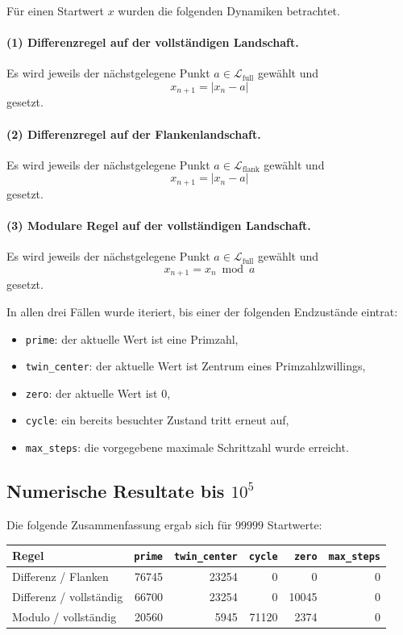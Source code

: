 \documentclass[11pt,a4paper]{article}
\theoremstyle{definition}
\theoremstyle{plain}
\theoremstyle{remark}
\begin{document}
	Für einen Startwert \(x\) wurden die folgenden Dynamiken betrachtet.
	
	\paragraph{(1) Differenzregel auf der vollständigen Landschaft.}
	Es wird jeweils der nächstgelegene Punkt \(a\in\mathcal L_{\mathrm{full}}\) gewählt und
	\[
	x_{n+1}=|x_n-a|
	\]
	gesetzt.
	
	\paragraph{(2) Differenzregel auf der Flankenlandschaft.}
	Es wird jeweils der nächstgelegene Punkt \(a\in\mathcal L_{\mathrm{flank}}\) gewählt und
	\[
	x_{n+1}=|x_n-a|
	\]
	gesetzt.
	
	\paragraph{(3) Modulare Regel auf der vollständigen Landschaft.}
	Es wird jeweils der nächstgelegene Punkt \(a\in\mathcal L_{\mathrm{full}}\) gewählt und
	\[
	x_{n+1}=x_n \bmod a
	\]
	gesetzt.
	
	In allen drei Fällen wurde iteriert, bis einer der folgenden Endzustände eintrat:
	
	\begin{itemize}
		\item \texttt{prime}: der aktuelle Wert ist eine Primzahl,
		\item \texttt{twin\_center}: der aktuelle Wert ist Zentrum eines Primzahlzwillings,
		\item \texttt{zero}: der aktuelle Wert ist \(0\),
		\item \texttt{cycle}: ein bereits besuchter Zustand tritt erneut auf,
		\item \texttt{max\_steps}: die vorgegebene maximale Schrittzahl wurde erreicht.
	\end{itemize}
	
	\subsection{Numerische Resultate bis \(10^5\)}
	
	Die folgende Zusammenfassung ergab sich für \(99999\) Startwerte:
	
	\begin{center}
		\begin{tabular}{lrrrrr}
			\hline
			Regel & \texttt{prime} & \texttt{twin\_center} & \texttt{cycle} & \texttt{zero} & \texttt{max\_steps} \\
			\hline
			Differenz / Flanken      & 76745 & 23254 & 0     & 0     & 0 \\
			Differenz / vollständig  & 66700 & 23254 & 0     & 10045 & 0 \\
			Modulo / vollständig     & 20560 & 5945  & 71120 & 2374  & 0 \\
			\hline
		\end{tabular}
	\end{center}
	
\end{document}
